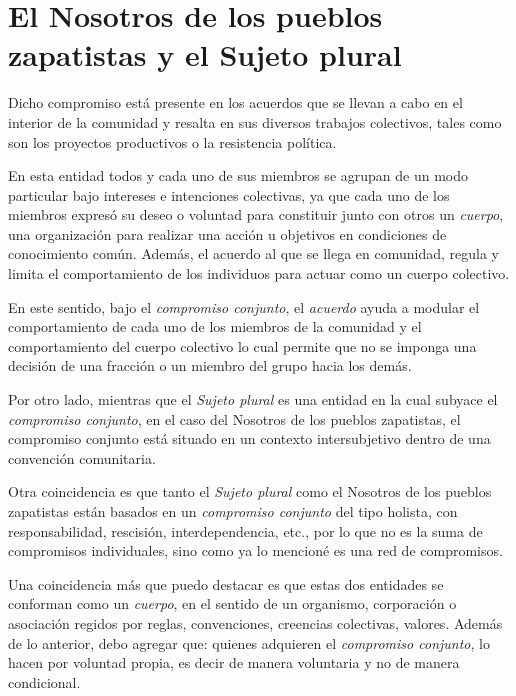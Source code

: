 \documentclass[oneside]{book}
\begin{document}
\section{El Nosotros de los pueblos zapatistas y el Sujeto plural}
	
Dicho compromiso está presente en los acuerdos que se llevan a cabo en el interior de la comunidad y resalta en sus diversos trabajos colectivos, tales como son los proyectos productivos o la resistencia política. 

En esta entidad todos y cada uno de sus miembros se agrupan de un modo particular bajo intereses e intenciones colectivas, ya que cada uno de los miembros expresó su deseo o voluntad para constituir junto con otros un \textit{cuerpo}, una organización para realizar una acción u objetivos en condiciones de conocimiento común. Además, el acuerdo al que se llega en comunidad, regula y limita el comportamiento de los individuos para actuar como un cuerpo colectivo.
	
En este sentido, bajo el \textit{compromiso conjunto}, el \textit{acuerdo} ayuda a modular el comportamiento de cada uno de los miembros de la comunidad y el comportamiento del cuerpo colectivo lo cual permite que no se imponga una decisión de una fracción o un miembro del grupo hacia los demás. 

Por otro lado, mientras que el \textit{Sujeto plural} es una entidad en la cual subyace el \textit{compromiso conjunto}, en el caso del Nosotros de los pueblos zapatistas, el compromiso conjunto está situado en un contexto intersubjetivo dentro de una convención comunitaria. 
	
Otra coincidencia es que tanto el \textit{Sujeto plural} como el Nosotros de los pueblos zapatistas están basados en un \textit{compromiso conjunto} del tipo holista, con responsabilidad, rescisión, interdependencia, etc., por lo que no es la suma de compromisos individuales, sino como ya lo mencioné es una red de compromisos.
	
Una coincidencia más que puedo destacar es que estas dos entidades se conforman como un \textit{cuerpo}, en el sentido de un organismo, corporación o asociación regidos por reglas, convenciones, creencias colectivas, valores. Además de lo anterior, debo agregar que: quienes adquieren el \textit{compromiso conjunto}, lo hacen por voluntad propia, es decir de manera voluntaria y no de manera condicional.
	
\end{document}
